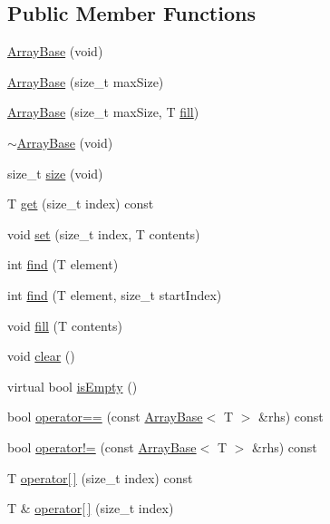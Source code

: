 \subsection*{Public Member Functions}
\begin{DoxyCompactItemize}
\item 
\hyperlink{classArrayBase_a949fbe49f202aed7d4ce8442b7fd0bd5}{Array\+Base} (void)
\item 
\hyperlink{classArrayBase_af9db2c439a3c5bc723c66d44ba4049a0}{Array\+Base} (size\+\_\+t max\+Size)
\item 
\hyperlink{classArrayBase_a5de8eae891c4d4f855a6739fc573de85}{Array\+Base} (size\+\_\+t max\+Size, T \hyperlink{classArrayBase_a6becc5e91c79d7693c0d406e466f9ec6}{fill})
\item 
\hyperlink{classArrayBase_a76eb6a2544ace5a6c8cc972b876b60a0}{$\sim$\+Array\+Base} (void)
\item 
size\+\_\+t \hyperlink{classArrayBase_aeed263e1e987901c8cc2c1e1d3102d73}{size} (void)
\item 
T \hyperlink{classArrayBase_aabda9501caf50b75ce09e7ef47fd1de7}{get} (size\+\_\+t index) const 
\item 
void \hyperlink{classArrayBase_a5a9fe61509061defe530d0ebc3a91497}{set} (size\+\_\+t index, T contents)
\item 
int \hyperlink{classArrayBase_adc718f38281ba844303941c4d111cc8c}{find} (T element)
\item 
int \hyperlink{classArrayBase_a450ec98ae75a13f7dfbd6ba499218b8e}{find} (T element, size\+\_\+t start\+Index)
\item 
void \hyperlink{classArrayBase_a6becc5e91c79d7693c0d406e466f9ec6}{fill} (T contents)
\item 
void \hyperlink{classArrayBase_a11dc3b617f2fedbb3b499971493b9c4f}{clear} ()
\item 
virtual bool \hyperlink{classArrayBase_a1687635b3bda64e9064e53b8d5a91ac1}{is\+Empty} ()
\item 
bool \hyperlink{classArrayBase_a95a446bcd6e8b2ff10e6f5c0232e6069}{operator==} (const \hyperlink{classArrayBase}{Array\+Base}$<$ T $>$ \&rhs) const 
\item 
bool \hyperlink{classArrayBase_acb1f14f8761d00708f25281854bf0769}{operator!=} (const \hyperlink{classArrayBase}{Array\+Base}$<$ T $>$ \&rhs) const 
\item 
T \hyperlink{classArrayBase_a654b9073ee55e973fc31a9c03affe423}{operator\mbox{[}$\,$\mbox{]}} (size\+\_\+t index) const 
\item 
T \& \hyperlink{classArrayBase_a38d83584b9e023781779af9dd733d822}{operator\mbox{[}$\,$\mbox{]}} (size\+\_\+t index)
\end{DoxyCompactItemize}


